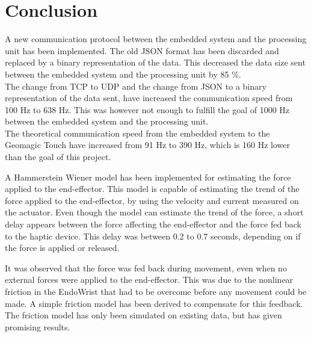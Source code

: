 \chapter{Conclusion}\label{cha:conclusion}


A new communication protocol between the embedded system and the processing unit has been implemented. The old JSON format has been discarded and replaced by a binary representation of the data. This decreased the data size sent between the embedded system and the processing unit by 85 \%.\\ 
The change from TCP to UDP and the change from JSON to a binary representation of the data sent, have increased the communication speed from 100 Hz to 638 Hz. This was however not enough to fulfill the goal of 1000 Hz between the embedded system and the processing unit.\\
The theoretical communication speed from the embedded system to the Geomagic Touch have increased from 91 Hz to 390 Hz, which is 160 Hz lower than the goal of this project. 



A Hammerstein Wiener model has been implemented for estimating the force applied to the end-effector. This model is capable of estimating the trend of the force applied to the end-effector, by
using the velocity and current measured on the actuator. Even though the model can estimate the trend of the force, a short delay appears between the force affecting the end-effector and the force fed back to the haptic device. This delay was between 0.2 to 0.7 seconds, depending on if the force is applied or released. 



It was observed that the force was fed back during movement, even when no external forces were applied to the end-effector. This was due to the nonlinear friction in the EndoWrist that had to be overcome before any movement could be made. A simple friction model has been derived to compensate for this feedback. The friction model has only been simulated on existing data, but has given promising results. 


